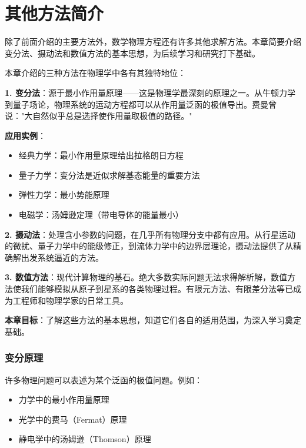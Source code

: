 
\chapter{其他方法简介}

\begin{wulibj}[本章导读]
除了前面介绍的主要方法外，数学物理方程还有许多其他求解方法。本章简要介绍变分法、摄动法和数值方法的基本思想，为后续学习和研究打下基础。
\end{wulibj}

\begin{wulibj}[物理背景]
本章介绍的三种方法在物理学中各有其独特地位：

\textbf{1. 变分法}：源于最小作用量原理——这是物理学最深刻的原理之一。从牛顿力学到量子场论，物理系统的运动方程都可以从作用量泛函的极值导出。费曼曾说："大自然似乎总是选择使作用量取极值的路径。"

\textbf{应用实例}：
\begin{itemize}
    \item 经典力学：最小作用量原理给出拉格朗日方程
    \item 量子力学：变分法是近似求解基态能量的重要方法
    \item 弹性力学：最小势能原理
    \item 电磁学：汤姆逊定理（带电导体的能量最小）
\end{itemize}

\textbf{2. 摄动法}：处理含小参数的问题，在几乎所有物理分支中都有应用。从行星运动的微扰、量子力学中的能级修正，到流体力学中的边界层理论，摄动法提供了从精确解出发系统逼近的方法。

\textbf{3. 数值方法}：现代计算物理的基石。绝大多数实际问题无法求得解析解，数值方法使我们能够模拟从原子到星系的各类物理过程。有限元方法、有限差分法等已成为工程师和物理学家的日常工具。

\textbf{本章目标}：了解这些方法的基本思想，知道它们各自的适用范围，为深入学习奠定基础。
\end{wulibj}


\subsection{变分原理}

许多物理问题可以表述为某个泛函的极值问题。例如：
\begin{itemize}
    \item 力学中的最小作用量原理
    \item 光学中的费马（Fermat）原理
    \item 静电学中的汤姆逊（Thomson）原理
\end{itemize}

